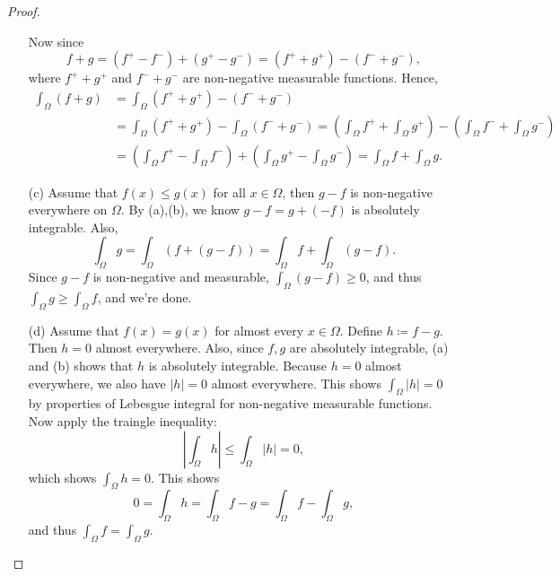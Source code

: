\begin{proof}
\begin{itemize}
        Now since 
        \[
            f + g = (f^+ - f^-) + (g^+ - g^-) = (f^+ + g^+) - (f^- + g^-),
        \]
        where \(f^+ + g^+\) and \(f^- + g^-\) are non-negative measurable functions. Hence,
        \begin{align*}
            \int _\Omega (f + g) &= \int _\Omega (f^+ + g^+) - (f^- + g^-) \\
            &= \int _\Omega (f^+ + g^+) - \int _\Omega (f^- + g^-) = \left( \int _\Omega f^+ + \int _\Omega g^+ \right) - \left( \int _\Omega f^- + \int _\Omega g^- \right) \\ 
            &= \left( \int _\Omega f^+ - \int _\Omega f^- \right) + \left( \int _\Omega g^+ - \int _\Omega g^- \right) = \int _\Omega f + \int _\Omega g.     
        \end{align*} 
        \item [(c)] Assume that \(f(x) \le g(x)\) for all \(x \in \Omega\), then \(g - f\) is non-negative everywhere on \(\Omega\). By (a),(b), we know \(g - f = g + (-f)\) is absolutely integrable. Also,
        \[
            \int _\Omega g = \int _\Omega (f + (g - f)) = \int _\Omega f + \int _\Omega (g - f).
        \]
        Since \(g - f\) is non-negative and measurable, \(\int _\Omega (g - f) \ge 0\), and thus \(\int _\Omega g \ge \int _\Omega f\), and we're done.
        \item [(d)] Assume that \(f(x) = g(x)\) for almost every \(x \in \Omega\). Define \(h \coloneqq f - g\). Then \(h = 0\) almost everywhere. Also, since \(f, g\) are absolutely integrable, (a) and (b) shows that \(h\) is absolutely integrable. Because \(h = 0\) almost everywhere, we also have \(\vert h \vert = 0\) almost everywhere. This shows \(\int _\Omega \vert h \vert = 0 \) by properties of Lebesgue integral for non-negative measurable functions. Now apply the traingle inequality:
        \[
            \left\vert \int _\Omega h \right\vert \le \int _\Omega \vert h \vert = 0,  
        \]
        which shows \(\int _\Omega h = 0\). This shows 
        \[
            0 = \int _\Omega h = \int _\Omega f - g = \int _\Omega f - \int _\Omega g,
        \] 
        and thus \(\int _\Omega f = \int _\Omega g\). 
    \end{itemize}
\end{proof}